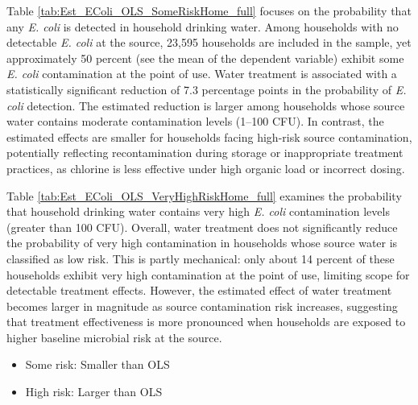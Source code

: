\documentclass [11pt]{article}
\theoremstyle{plain}
\theoremstyle{definition}
\theoremstyle{remark}
\newcommand{\1}{\bm{1}}
\begin{document}
Table \ref{tab:Est_EColi_OLS_SomeRiskHome_full} focuses on the probability that any \textit{E. coli} is detected in household drinking water. Among households with no detectable \textit{E. coli} at the source, 23,595 households are included in the sample, yet approximately 50 percent (see the mean of the dependent variable) exhibit some \textit{E. coli} contamination at the point of use. Water treatment is associated with a statistically significant reduction of 7.3 percentage points in the probability of \textit{E. coli} detection. The estimated reduction is larger among households whose source water contains moderate contamination levels (1–100 CFU). In contrast, the estimated effects are smaller for households facing high-risk source contamination, potentially reflecting recontamination during storage or inappropriate treatment practices, as chlorine is less effective under high organic load or incorrect dosing.


{\renewcommand\normalsize{\small}\normalsize\singlespacing  

}  

Table \ref{tab:Est_EColi_OLS_VeryHighRiskHome_full} examines the probability that household drinking water contains very high \textit{E. coli} contamination levels (greater than 100 CFU). Overall, water treatment does not significantly reduce the probability of very high contamination in households whose source water is classified as low risk. This is partly mechanical: only about 14 percent of these households exhibit very high contamination at the point of use, limiting scope for detectable treatment effects. However, the estimated effect of water treatment becomes larger in magnitude as source contamination risk increases, suggesting that treatment effectiveness is more pronounced when households are exposed to higher baseline microbial risk at the source.

{\renewcommand\normalsize{\small}\normalsize\singlespacing  

}  

\begin{itemize}
	\item Some risk: Smaller than OLS
	\item High risk: Larger than OLS
\end{itemize}
\end{document}
